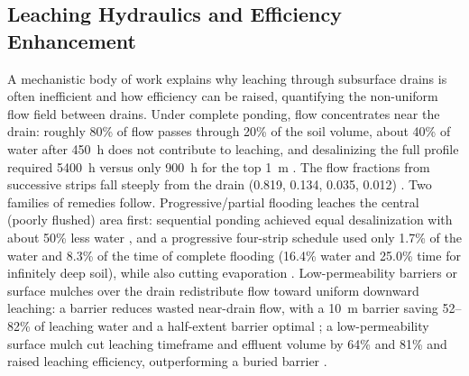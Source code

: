 \subsection{Leaching Hydraulics and Efficiency Enhancement}

A mechanistic body of work explains why leaching through subsurface drains is often inefficient and how efficiency can be raised, quantifying the non-uniform flow field between drains. Under complete ponding, flow concentrates near the drain: roughly 80\% of flow passes through 20\% of the soil volume, about 40\% of water after 450~h does not contribute to leaching, and desalinizing the full profile required 5400~h versus only 900~h for the top 1~m \parencite{RAO1991}. The flow fractions from successive strips fall steeply from the drain (0.819, 0.134, 0.035, 0.012) \parencite{Youngs2000}. Two families of remedies follow. Progressive/partial flooding leaches the central (poorly flushed) area first: sequential ponding achieved equal desalinization with about 50\% less water \parencite{RAO1991}, and a progressive four-strip schedule used only 1.7\% of the water and 8.3\% of the time of complete flooding (16.4\% water and 25.0\% time for infinitely deep soil), while also cutting evaporation \parencite{Youngs2000}. Low-permeability barriers or surface mulches over the drain redistribute flow toward uniform downward leaching: a barrier reduces wasted near-drain flow, with a 10~m barrier saving 52--82\% of leaching water and a half-extent barrier optimal \parencite{Yu2018}; a low-permeability surface mulch cut leaching timeframe and effluent volume by 64\% and 81\% and raised leaching efficiency, outperforming a buried barrier \parencite{Zhang2022}.

